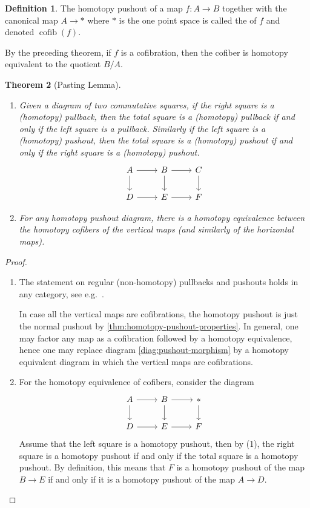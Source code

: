 \documentclass{scrartcl}
\let\emph\relax
\theoremstyle{plain}
\newtheorem{theorem}{Theorem}[section]
\theoremstyle{definition}
\newtheorem{definition}[theorem]{Definition}
\DeclareMathOperator{\cofib}{cofib}
\begin{document}
\begin{definition}
    The homotopy pushout of a map $f\colon A\to B$ together with the canonical map $A\to *$ where $*$ is the one point space is called the \emph{homotopy cofiber} of $f$ and denoted $\cofib(f)$. 
\end{definition}
By the preceding theorem, if $f$ is a cofibration, then the cofiber is homotopy equivalent to the quotient $B/A$.


\begin{theorem}[Pasting Lemma]\label{thm:pasting-lemma}
    \begin{enumerate}
    \item Given a diagram of two commutative squares, if the right square is a (homotopy) pullback, then the total square is a (homotopy) pullback if and only if the left square is a pullback. Similarly if the left square is a (homotopy) pushout, then the total square is a (homotopy) pushout if and only if the right square is a (homotopy) pushout.
\begin{equation}\label{diag:pushout-morphism}
    \begin{tikzcd}
        A \dar\rar & B \dar\rar &\dar C \\
        D \rar & E \rar & F
    \end{tikzcd}
\end{equation}
    \item For any homotopy pushout diagram, there is a homotopy equivalence between the homotopy cofibers of the vertical maps (and similarly of the horizontal maps).
\end{enumerate}
\end{theorem}
\begin{proof}
    \begin{enumerate}
        \item The statement on regular (non-homotopy) pullbacks and pushouts holds in any category, see e.g.\ \cite[p. 72, ex. 8]{mac2013categories}.
            
            In case all the vertical maps are cofibrations, the homotopy pushout is just the normal pushout by \cref{thm:homotopy-pushout-properties}. In general, one may factor any map as a cofibration followed by a homotopy equivalence, hence one may replace diagram \ref{diag:pushout-morphism} by a homotopy equivalent diagram in which the vertical maps are cofibrations. 
        \item For the homotopy equivalence of cofibers, consider the diagram
        \begin{equation}
            \begin{tikzcd}
                A \dar\rar & B \dar\rar &\dar * \\
                D \rar & E \rar & F
            \end{tikzcd}
        \end{equation}
        Assume that the left square is a homotopy pushout, then by (1), the right square is a homotopy pushout if and only if the total square is a homotopy pushout. By definition, this means that $F$ is a homotopy pushout of the map $B\to E$ if and only if it is a homotopy pushout of the map $A\to D$. 
    \end{enumerate}
\end{proof}
\end{document}
